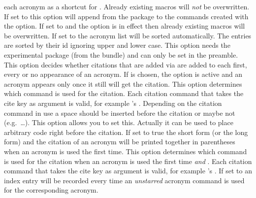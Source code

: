 \documentclass[load-preamble+]{cnltx-doc}
\begin{document}
\begin{options}
    each acronym as a shortcut for .  Already existing macros
    will \emph{not} be overwritten.
    If set to  this option will append  from the
     package to the commands created with the 
    option.
    If set to  and the option  is in effect
    then already existing macros will be overwritten.
    If set to  the acronym list will be sorted automatically.  The
    entries are sorted by their \acs{id} ignoring upper and lower case.  This
    option needs the experimental package  (from the
     bundle) and can only be set in the preamble.
    This option decides whether citations that are added
    via  are added to each first, every or no appearance of an
    acronym.  If  is chosen, the option  is
    active and an acronym appears only once it still will get the citation.
    This option determines which command is used for the citation.  Each
    citation command that takes the cite key as argument is valid, for example
    's .
    Depending on the citation command in use a space should be inserted before
    the citation or maybe not (e.g.\ \ldots).  This option
    allows you to set this.  Actually it can be used to place arbitrary code
    right before the citation.
    If set to true the short form (or the long form) and the
    citation of an acronym will be printed together in parentheses when an
    acronym is used the first time.
    This option determines which command is used for the
    citation when an acronym is used the first time \emph{and}
    .  Each citation command that takes the cite
    key as argument is valid, for example 's .
    If set to  an index entry will be recorded every time an
    \emph{unstarred} acronym command is used for the corresponding acronym.

\end{options}
\end{document}
